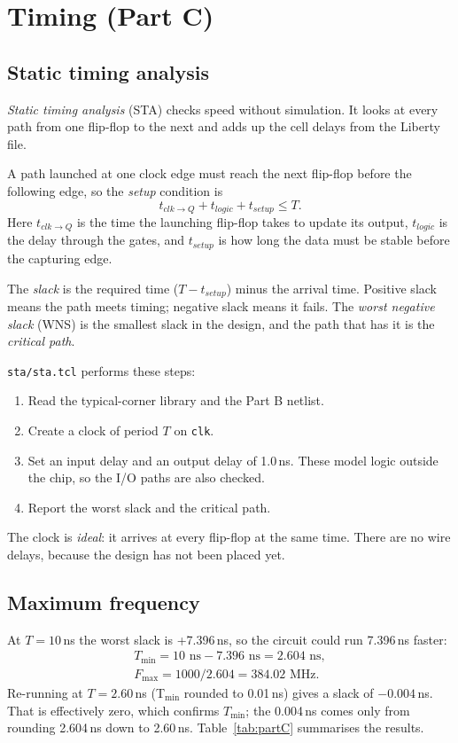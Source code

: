 \documentclass[10pt,a4paper,twocolumn]{article}
\newcommand{\Tmin}{$T_{\min}$}
\begin{document}
\section{Timing (Part C)}

\subsection{Static timing analysis}
\emph{Static timing analysis} (STA) checks speed without simulation. It looks at every path from one flip-flop to the next and adds up the cell delays from the Liberty file.

A path launched at one clock edge must reach the next flip-flop before the following edge, so the \emph{setup} condition is
\begin{equation*}
t_{clk\to Q} + t_{logic} + t_{setup} \le T.
\end{equation*}
Here $t_{clk\to Q}$ is the time the launching flip-flop takes to update its output, $t_{logic}$ is the delay through the gates, and $t_{setup}$ is how long the data must be stable before the capturing edge.

The \emph{slack} is the required time ($T - t_{setup}$) minus the arrival time. Positive slack means the path meets timing; negative slack means it fails. The \emph{worst negative slack} (WNS) is the smallest slack in the design, and the path that has it is the \emph{critical path}.

\texttt{sta/sta.tcl} performs these steps:
\begin{enumerate}
  \item Read the typical-corner library and the Part B netlist.
  \item Create a clock of period $T$ on \texttt{clk}.
  \item Set an input delay and an output delay of 1.0\,ns. These model logic outside the chip, so the I/O paths are also checked.
  \item Report the worst slack and the critical path.
\end{enumerate}
The clock is \emph{ideal}: it arrives at every flip-flop at the same time. There are no wire delays, because the design has not been placed yet.

\subsection{Maximum frequency}
At $T = 10$\,ns the worst slack is +7.396\,ns, so the circuit could run 7.396\,ns faster:
\begin{gather*}
T_{\min} = 10\text{ ns} - 7.396\text{ ns} = 2.604\text{ ns},\\
F_{\max} = 1000 / 2.604 = 384.02\text{ MHz}.
\end{gather*}
Re-running at $T = 2.60$\,ns (T$_{\min}$ rounded to 0.01\,ns) gives a slack of $-0.004$\,ns. That is effectively zero, which confirms \Tmin; the 0.004\,ns comes only from rounding 2.604\,ns down to 2.60\,ns. Table~\ref{tab:partC} summarises the results.
\end{document}
